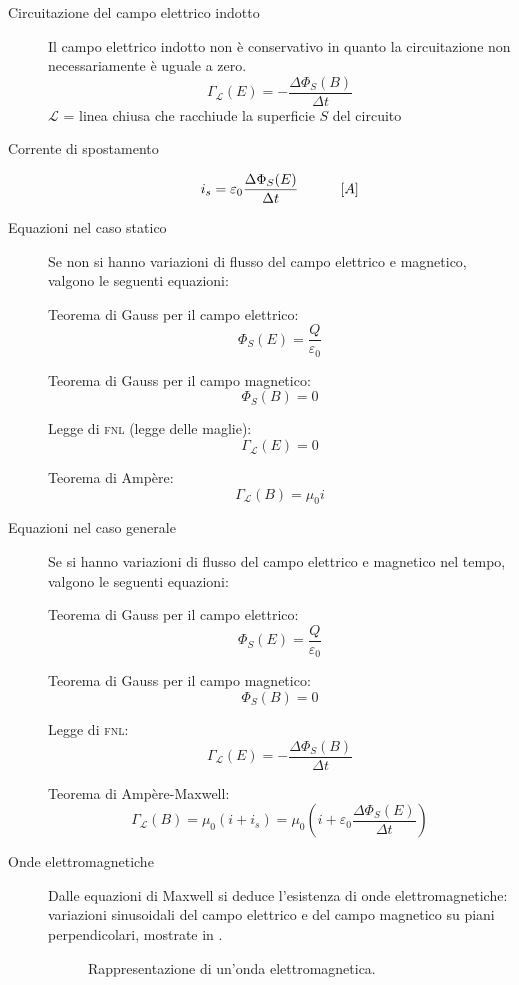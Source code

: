 \documentclass[a4paper,11pt,italian]{article}
\begin{document}
\begin{description}
  \item[Circuitazione del campo elettrico indotto] 
  Il campo elettrico indotto non è conservativo in quanto la circuitazione non necessariamente è uguale a zero.
  \[ \Gamma_\mathscr{L}(E) = - \frac{\Delta \Phi_S(B)}{\Delta t}  \]
  $ \mathscr{L} $ = linea chiusa che racchiude la superficie $ S $ del circuito
  
  \item[Corrente di spostamento] 
  \[ i_s = \varepsilon_0 \frac{\Delta \Phi_S(E)}{\Delta t} \hspace*{3em} [A]\]
  
  \item[Equazioni nel caso statico] 
  Se non si hanno variazioni di flusso del campo elettrico e magnetico, valgono le seguenti equazioni:
\begin{multicols}{2}
Teorema di Gauss per il campo elettrico:
  \[ \Phi_S(E) = \frac{Q}{\varepsilon_0}  \]

Teorema di Gauss per il campo magnetico:
  \[ \Phi_S(B) = 0 \]

Legge di \textsc{fnl} (legge delle maglie):
  \[ \Gamma_\mathscr{L}(E) = 0 \]

Teorema di Ampère:
  \[ \Gamma_\mathscr{L}(B) = \mu_0 i \]
\end{multicols}  

  \item[Equazioni nel caso generale] 
  Se si hanno variazioni di flusso del campo elettrico e magnetico nel tempo, valgono le seguenti equazioni:
\begin{multicols}{2}
Teorema di Gauss per il campo elettrico:
  \[ \Phi_S(E) = \frac{Q}{\varepsilon_0}  \]

Teorema di Gauss per il campo magnetico:
  \[ \Phi_S(B) = 0 \]

Legge di \textsc{fnl}:
  \[ \Gamma_\mathscr{L}(E) = - \frac{\Delta\Phi_S(B)}{\Delta t} \]

Teorema di Ampère-Maxwell:
  \[ \Gamma_\mathscr{L}(B) = \mu_0 \left( i + i_s \right) = \mu_0 \left( i + \varepsilon_0 \frac{\Delta\Phi_S(E)}{\Delta t} \right) \]
\end{multicols}
  
  \item[Onde elettromagnetiche] 
  Dalle equazioni di Maxwell si deduce l'esistenza di onde elettromagnetiche: variazioni sinusoidali del campo elettrico e del campo magnetico su piani perpendicolari, mostrate in .
  \begin{figure}[htp]\centering
  
  \caption{Rappresentazione di un'onda elettromagnetica.}
  \label{img:ondaelettromagnetica}
  \end{figure}
  

\end{description}
\end{document}
